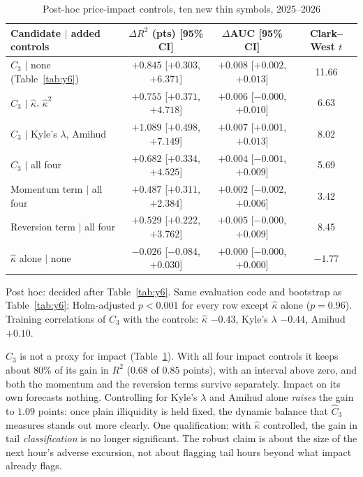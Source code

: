 \begin{table}[t]\centering\small
\begin{threeparttable}
\caption{Post-hoc price-impact controls, ten new thin symbols, 2025--2026}\label{tab:y8}
\begin{tabular}{lccc}
\toprule
Candidate $\mid$ added controls & $\Delta R^2$ (pts) [95\% CI] & $\Delta$AUC [95\% CI] & Clark--West $t$\\
\midrule
$\hat C_3$ $\mid$ none (Table~\ref{tab:y6}) & $+0.845$ [$+0.303$, $+6.371$] & $+0.008$ [$+0.002$, $+0.013$] & 11.66\\
$\hat C_3$ $\mid$ $\hat\kappa$, $\hat\kappa^2$ & $+0.755$ [$+0.371$, $+4.718$] & $+0.006$ [$-0.000$, $+0.010$] & 6.63\\
$\hat C_3$ $\mid$ Kyle's $\lambda$, Amihud & $+1.089$ [$+0.498$, $+7.149$] & $+0.007$ [$+0.001$, $+0.013$] & 8.02\\
$\hat C_3$ $\mid$ all four & $+0.682$ [$+0.334$, $+4.525$] & $+0.004$ [$-0.001$, $+0.009$] & 5.69\\
Momentum term $\mid$ all four & $+0.487$ [$+0.311$, $+2.384$] & $+0.002$ [$-0.002$, $+0.006$] & 3.42\\
Reversion term $\mid$ all four & $+0.529$ [$+0.222$, $+3.762$] & $+0.005$ [$-0.000$, $+0.009$] & 8.45\\
$\hat\kappa$ alone $\mid$ none & $-0.026$ [$-0.084$, $+0.030$] & $+0.000$ [$-0.000$, $+0.000$] & $-1.77$\\
\bottomrule
\end{tabular}
\begin{tablenotes}\footnotesize\item Post hoc: decided after Table~\ref{tab:y6}. Same evaluation code and bootstrap as Table~\ref{tab:y6}; Holm-adjusted $p<0.001$ for every row except $\hat\kappa$ alone ($p=0.96$). Training correlations of $\hat C_3$ with the controls: $\hat\kappa$ $-0.43$, Kyle's $\lambda$ $-0.44$, Amihud $+0.10$. \end{tablenotes}
\end{threeparttable}
\end{table}

$\hat C_3$ is not a proxy for impact (Table~\ref{tab:y8}). With all four impact controls it keeps about 80\% of its gain in $R^2$ ($0.68$ of $0.85$ points), with an interval above zero, and both the momentum and the reversion terms survive separately. Impact on its own forecasts nothing. Controlling for Kyle's $\lambda$ and Amihud alone \emph{raises} the gain to $1.09$ points: once plain illiquidity is held fixed, the dynamic balance that $\hat C_3$ measures stands out more clearly. One qualification: with $\hat\kappa$ controlled, the gain in tail \emph{classification} is no longer significant. The robust claim is about the size of the next hour's adverse excursion, not about flagging tail hours beyond what impact already flags.

